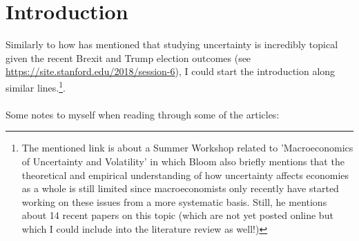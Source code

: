 \documentclass[a4paper,12pt,oneside,pointednumbers,numbers=noenddot,bibtotoc,bigheadings,liststotoc,chapterprefix=true]{scrbook}
\begin{document}
\chapter{Introduction}
Similarly to how \citet{bloom:09} has mentioned that studying uncertainty is incredibly topical given the recent Brexit and Trump election outcomes (see \url{https://site.stanford.edu/2018/session-6}), I could start the introduction along similar lines.\footnote{The mentioned link is about a Summer Workshop related to 'Macroeconomics of Uncertainty and Volatility' in which Bloom also briefly mentions that the theoretical and empirical understanding of how uncertainty affects economies as a whole is still limited since macroeconomists only recently have started working on these issues from a more systematic basis. Still, he mentions about 14 recent papers on this topic (which are not yet posted online but which I could include into the literature review as well!)}.
\\
\\
Some notes to myself when reading through some of the articles:
\end{document}
